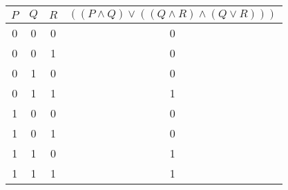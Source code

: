 \begin{tabular}{|c|c|c||c|}
\hline
$ P $ & $ Q $ & $ R $ & $ ((P \wedge Q) \vee ((Q \wedge R) \wedge (Q \vee R))) $ \\
\hline
0 & 0 & 0 & 0 \\
0 & 0 & 1 & 0 \\
0 & 1 & 0 & 0 \\
0 & 1 & 1 & 1 \\
1 & 0 & 0 & 0 \\
1 & 0 & 1 & 0 \\
1 & 1 & 0 & 1 \\
1 & 1 & 1 & 1 \\
\hline
\end{tabular}
\label{table:tt1}
